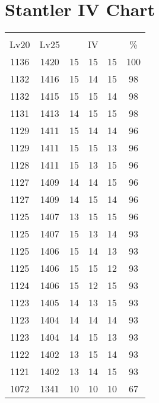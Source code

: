 \documentclass{article}%
\begin{document}
%
\normalsize%
\section{Stantler IV Chart}%
\label{sec:Stantler IV Chart}%
\renewcommand{\arraystretch}{1.5}%
\begin{tabular}{|c|c|c|c|c|c|}%
\hline%
\multicolumn{6}{|c|}{\textcolor{white}{ 
\linebreak{Stantler}
}%
\cellcolor{black}}\\%
\multicolumn{1}{|c}{Lv20}&\multicolumn{1}{c|}{Lv25}&\multicolumn{3}{c|}{IV}&\multicolumn{1}{|c|}{\%}\\%
\hline%
\rowcolor{color100}%
1136&1420&15&15&15&100\\%
\hline%
\rowcolor{color98}%
1132&1416&15&14&15&98\\%
\hline%
\rowcolor{color98}%
1132&1415&15&15&14&98\\%
\hline%
\rowcolor{color98}%
1131&1413&14&15&15&98\\%
\hline%
\rowcolor{color96}%
1129&1411&15&14&14&96\\%
\hline%
\rowcolor{color96}%
1129&1411&15&15&13&96\\%
\hline%
\rowcolor{color96}%
1128&1411&15&13&15&96\\%
\hline%
\rowcolor{color96}%
1127&1409&14&14&15&96\\%
\hline%
\rowcolor{color96}%
1127&1409&14&15&14&96\\%
\hline%
\rowcolor{color96}%
1125&1407&13&15&15&96\\%
\hline%
\rowcolor{color93}%
1125&1407&15&13&14&93\\%
\hline%
\rowcolor{color93}%
1125&1406&15&14&13&93\\%
\hline%
\rowcolor{color93}%
1125&1406&15&15&12&93\\%
\hline%
\rowcolor{color93}%
1124&1406&15&12&15&93\\%
\hline%
\rowcolor{color93}%
1123&1405&14&13&15&93\\%
\hline%
\rowcolor{color93}%
1123&1404&14&14&14&93\\%
\hline%
\rowcolor{color93}%
1123&1404&14&15&13&93\\%
\hline%
\rowcolor{color93}%
1122&1402&13&15&14&93\\%
\hline%
\rowcolor{color93}%
1121&1402&13&14&15&93\\%
\hline%
\rowcolor{color91}%
1072&1341&10&10&10&67\\%
\end{tabular}

%
\end{document}
